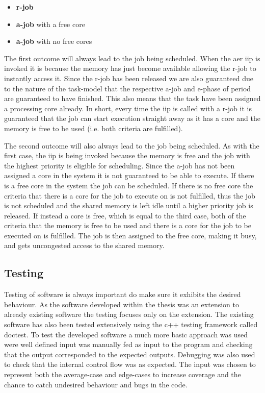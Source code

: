 \documentclass{kththesis}
\begin{document}
\begin {itemize}
    \item \textbf{\acrshort{r}-job}
    \item \textbf{\acrshort{a}-job} with a free core
    \item \textbf{\acrshort{a}-job} with no free cores
\end {itemize}

The first outcome will always lead to the job being scheduled. When the \acrshort{aer}
\acrshort{iip} is invoked it is because the memory has just become available allowing the
\acrshort{r}-job to instantly access it. Since the \acrshort{r}-job has been released we are also
guaranteed due to the nature of the task-model that the respective \acrshort{a}-job and
\acrshort{e}-phase of period are guaranteed to have finished. This also means that the task have
been assigned a processing core already. In short, every time the \acrshort{iip} is called with a
\acrshort{r}-job it is guaranteed that the job can start execution straight away as it has a core
and the memory is free to be used (i.e. both criteria are fulfilled). 

The second outcome will also always lead to the job being scheduled. As with the first case, the
\acrshort{iip} is being invoked because the memory is free and the job with the highest priority is
eligible for scheduling. Since the \acrshort{a}-job has not been assigned a core in the system
it is not guaranteed to be able to execute. If there is a free core in the system the job can be
scheduled. If there is no free core the criteria that there is a core for the job to execute on is
not fulfilled, thus the job is not scheduled and the shared memory is left idle until a higher
priority job is released. If instead a core is free, which is equal to the third case, both of the
criteria that the memory is free to be used and there is a core for the job to be executed on is
fulfilled. The job is then assigned to the free core, making it busy, and gets uncongested access
to the shared memory.

\subsection{Testing}

Testing of software is always important do make sure it exhibits the desired behaviour. As the
software developed within the thesis was an extension to already existing software the testing
focuses only on the extension. The existing software has also been tested extensively using the c++
testing framework called doctest. To test the developed software a much more basic approach was used
were well defined input was manually fed as input to the program and checking that the output
corresponded to the expected outputs. Debugging was also used to check that the internal control
flow was as expected. The input was chosen to represent both the average-case and edge-cases to
increase coverage and the chance to catch undesired behaviour and bugs in the code.
\end{document}
